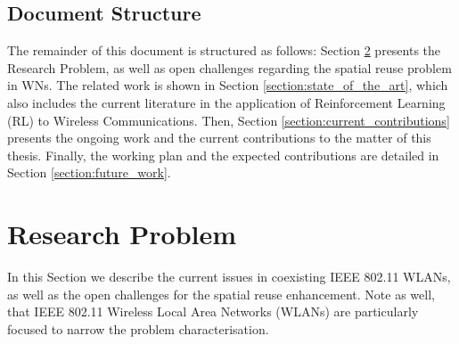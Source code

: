 \documentclass[12pt, a4paper,twoside]{tesi_upf}
\begin{document}
		\section{Document Structure}
		\label{section:document_structure}
			The remainder of this document is structured as follows: Section \ref{section:research_problem} presents the Research Problem, as well as open challenges regarding the spatial reuse problem in WNs. The related work is shown in Section \ref{section:state_of_the_art}, which also includes the current literature in the application of Reinforcement Learning (RL) to Wireless Communications. Then, Section \ref{section:current_contributions} presents the ongoing work and the current contributions to the matter of this thesis. Finally, the working plan and the expected contributions are detailed in Section \ref{section:future_work}.

	\chapter{Research Problem}
	\label{section:research_problem}
		In this Section we describe the current issues in coexisting IEEE 802.11 WLANs, as well as the open challenges for the spatial reuse enhancement. Note as well, that IEEE 802.11 Wireless Local Area Networks (WLANs) are particularly focused to narrow the problem characterisation.
		
\end{document}
